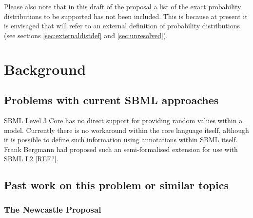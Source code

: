 \documentclass[draftspec]{sbmlpkgspec}
\begin{document}
Please also note that in this draft of the proposal a list of the
exact probability distributions to be supported has not been
included. This is because at present it is envisaged that
\distribshort will refer to an external definition of probability
distributions (see sections \ref{sec:externaldistdef} and
\ref{sec:unresolved}).



\section{Background}

\subsection{Problems with current SBML approaches}

SBML Level 3 Core has no direct support for providing random values
within a model. Currently there is no workaround within the core
language itself, although it is possible to define such information
using annotations within SBML itself. Frank Bergmann had proposed such
an semi-formalised extension for use with SBML L2 [REF?].

\subsection{Past work on this problem or similar topics}

\subsubsection{The Newcastle Proposal}
\label{sec:newcastle proposal}
\end{document}
